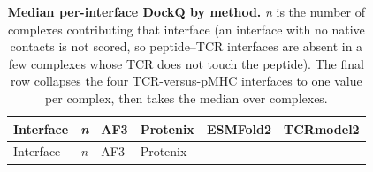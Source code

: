 \documentclass[
  11pt,
]{article}
\begin{document}
\begin{longtable}[]{@{}
  >{\raggedright\arraybackslash}p{}
  >{\raggedleft\arraybackslash}p{}
  >{\raggedleft\arraybackslash}p{}
  >{\raggedleft\arraybackslash}p{}
  >{\raggedleft\arraybackslash}p{}
  >{\raggedleft\arraybackslash}p{}@{}}
\caption{\textbf{Median per-interface DockQ by method.} \emph{n} is the
number of complexes contributing that interface (an interface with no
native contacts is not scored, so peptide--TCR interfaces are absent in
a few complexes whose TCR does not touch the peptide). The final row
collapses the four TCR-versus-pMHC interfaces to one value per complex,
then takes the median over complexes.}\tabularnewline
\toprule\noalign{}
\begin{minipage}[b]{\linewidth}\raggedright
Interface
\end{minipage} & \begin{minipage}[b]{\linewidth}\raggedleft
\emph{n}
\end{minipage} & \begin{minipage}[b]{\linewidth}\raggedleft
AF3
\end{minipage} & \begin{minipage}[b]{\linewidth}\raggedleft
Protenix
\end{minipage} & \begin{minipage}[b]{\linewidth}\raggedleft
ESMFold2
\end{minipage} & \begin{minipage}[b]{\linewidth}\raggedleft
TCRmodel2
\end{minipage} \\
\midrule\noalign{}
\endfirsthead
\toprule\noalign{}
\begin{minipage}[b]{\linewidth}\raggedright
Interface
\end{minipage} & \begin{minipage}[b]{\linewidth}\raggedleft
\emph{n}
\end{minipage} & \begin{minipage}[b]{\linewidth}\raggedleft
AF3
\end{minipage} & \begin{minipage}[b]{\linewidth}\raggedleft
Protenix
\end{minipage} & \begin{minipage}[b]{\linewidth}\raggedleft

\end{minipage}
\end{longtable}
\end{document}
